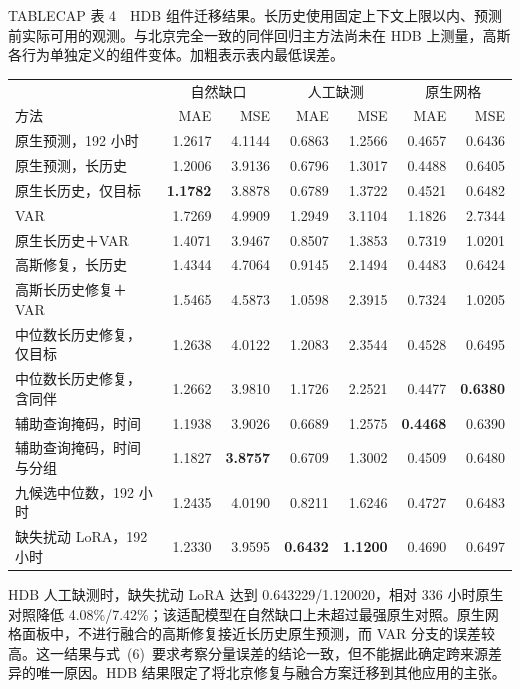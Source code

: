 TABLECAP 表 4　HDB 组件迁移结果。长历史使用固定上下文上限以内、预测前实际可用的观测。与北京完全一致的同伴回归主方法尚未在 HDB 上测量，高斯各行为单独定义的组件变体。加粗表示表内最低误差。

\begin{tabular}{lrrrrrr}
\toprule
 & \multicolumn{2}{c}{自然缺口} & \multicolumn{2}{c}{人工缺测} & \multicolumn{2}{c}{原生网格}\\
方法 & MAE & MSE & MAE & MSE & MAE & MSE\\
\midrule
原生预测，192 小时 & 1.2617 & 4.1144 & 0.6863 & 1.2566 & 0.4657 & 0.6436 \\
原生预测，长历史 & 1.2006 & 3.9136 & 0.6796 & 1.3017 & 0.4488 & 0.6405 \\
原生长历史，仅目标 & \textbf{1.1782} & 3.8878 & 0.6789 & 1.3722 & 0.4521 & 0.6482 \\
VAR & 1.7269 & 4.9909 & 1.2949 & 3.1104 & 1.1826 & 2.7344 \\
原生长历史＋VAR & 1.4071 & 3.9467 & 0.8507 & 1.3853 & 0.7319 & 1.0201 \\
高斯修复，长历史 & 1.4344 & 4.7064 & 0.9145 & 2.1494 & 0.4483 & 0.6424 \\
高斯长历史修复＋VAR & 1.5465 & 4.5873 & 1.0598 & 2.3915 & 0.7324 & 1.0205 \\
中位数长历史修复，仅目标 & 1.2638 & 4.0122 & 1.2083 & 2.3544 & 0.4528 & 0.6495 \\
中位数长历史修复，含同伴 & 1.2662 & 3.9810 & 1.1726 & 2.2521 & 0.4477 & \textbf{0.6380} \\
辅助查询掩码，时间 & 1.1938 & 3.9026 & 0.6689 & 1.2575 & \textbf{0.4468} & 0.6390 \\
辅助查询掩码，时间与分组 & 1.1827 & \textbf{3.8757} & 0.6709 & 1.3002 & 0.4509 & 0.6480 \\
九候选中位数，192 小时 & 1.2435 & 4.0190 & 0.8211 & 1.6246 & 0.4727 & 0.6483 \\
缺失扰动 LoRA，192 小时 & 1.2330 & 3.9595 & \textbf{0.6432} & \textbf{1.1200} & 0.4690 & 0.6497 \\
\bottomrule

\end{tabular}



HDB 人工缺测时，缺失扰动 LoRA 达到 0.643229/1.120020，相对 336 小时原生对照降低 4.08\%/7.42\%；该适配模型在自然缺口上未超过最强原生对照。原生网格面板中，不进行融合的高斯修复接近长历史原生预测，而 VAR 分支的误差较高。这一结果与式~(6)~要求考察分量误差的结论一致，但不能据此确定跨来源差异的唯一原因。HDB 结果限定了将北京修复与融合方案迁移到其他应用的主张。

